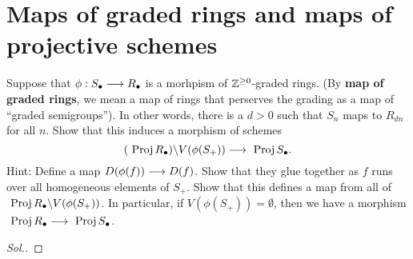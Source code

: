 \documentclass[11pt]{book} %
\begin{document}
\section{Maps of graded rings and maps of projective schemes}
\begin{exr}
Suppose that $\phi:S_\bullet\longrightarrow R_\bullet$ is a morhpism of $\mathbb Z^{\geq 0}$-graded rings. (By \textbf{ map of graded rings}, we mean a map of rings that perserves the grading as a map of ``graded semigroups''). In other words, there is a $d> 0$ such that $S_n$ maps to $R_{dn}$ for all $n$. Show that this induces  a morphism of schemes
$$
(\text{ Proj\,} R_\bullet)\backslash V(\phi(S_+))\longrightarrow \text{ Proj\,} S_\bullet.
$$
Hint:
Define a map $D(\phi(f))\longrightarrow D(f)$. Show that they glue together as $f$ runs over all homogeneous elements of $S_+$. Show that this defines a map from all of $\text{ Proj\,} R_\bullet\backslash V(\phi(S_+))$. In particular, if $V(\phi(S_+))=\emptyset$, then we have a morphism $\text{ Proj\,} R_\bullet\longrightarrow \text{ Proj\,} S_\bullet$. 
\end{exr}
\begin{proof}[Sol.]
\end{proof}
\end{document}
